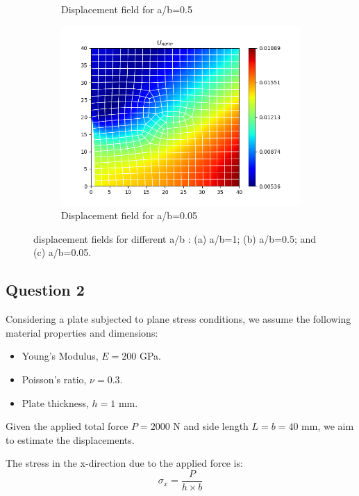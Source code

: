 \documentclass[twoside,twocolumn,10pt]{article}
\begin{document}
\begin{figure}[!ht]
\begin{subfigure}[c]{0.32\textwidth}
    \caption{Displacement field for a/b=0.5}
    \label{fig:disp_05}
  \end{subfigure}
  \hfill
  \begin{subfigure}[c]{0.32\textwidth}
    \centering
    \includegraphics[width=1.\linewidth]{Q2_1/Q1_0.05_2_quad.png}
    \caption{Displacement field for a/b=0.05}
    \label{fig:disp_005}
  \end{subfigure}
  \caption{ displacement fields for different a/b : (a) a/b=1; (b) a/b=0.5; and (c) a/b=0.05.}
  \label{fig:disp}  
\end{figure} 

\subsection{Question 2}
Considering a plate subjected to plane stress conditions, we assume the following material properties and dimensions:
\begin{itemize}
    \item Young's Modulus, \( E = 200 \) GPa.
    \item Poisson's ratio, \( \nu = 0.3 \).
    \item Plate thickness, \( h = 1 \) mm.
\end{itemize}
Given the applied total force \( P = 2000 \) N and side length \( L = b = 40 \) mm, we aim to estimate the displacements.

The stress in the x-direction due to the applied force is:
\begin{equation}
\sigma_x = \frac{P}{h \times b}
\end{equation}
\end{document}
